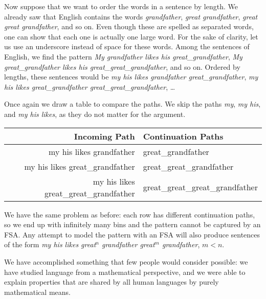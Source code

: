 \begin{examplebox}
    Now suppose that we want to order the words in a sentence by length.
    We already saw that English contains the words \emph{grandfather}, \emph{great grandfather}, \emph{great great grandfather}, and so on.
    Even though these are spelled as separated words, one can show that each one is actually one large word.
    For the sake of clarity, let us use an underscore instead of space for these words.
    Among the sentences of English, we find the pattern \emph{My grandfather likes his great\_grandfather}, \emph{My great\_grandfather likes his great\_great\_grandfather}, and so on.
    Ordered by lengths, these sentences would be \emph{my his likes grandfather great\_grandfather}, \emph{my his likes great\_grandfather great\_great\_grandfather}, \ldots

    Once again we draw a table to compare the paths.
    We skip the paths \emph{my}, \emph{my his}, and \emph{my his likes}, as they do not matter for the argument.
    \begin{center}
        \begin{tabular}{rl}
            \toprule
            \textbf{Incoming Path} & \textbf{Continuation Paths}\\
            \midrule
            my his likes grandfather & great\_grandfather\\
            my his likes great\_grandfather & great\_great\_grandfather\\
            my his likes great\_great\_grandfather & great\_great\_great\_grandfather\\
            \bottomrule
        \end{tabular}
    \end{center}
    We have the same problem as before: each row has different continuation paths, so we end up with infinitely many bins and the pattern cannot be captured by an FSA\@.
    Any attempt to model the pattern with an FSA will also produce sentences of the form \emph{my his likes great$^n$ grandfather great$^m$ grandfather}, $m < n$.
\end{examplebox}

We have accomplished something that few people would consider possible: we have studied language from a mathematical perspective, and we were able to explain properties that are shared by all human languages by purely mathematical means.

\bigskip
{}

